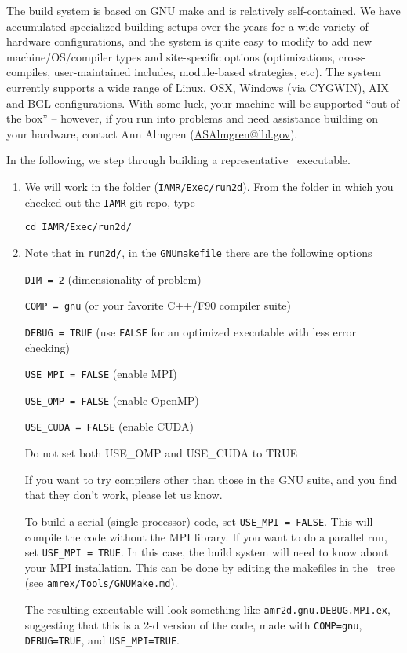 The build system is based on GNU make and is relatively self-contained.  We have accumulated 
specialized building setups over the years for a wide variety of hardware configurations, and 
the system is quite easy to modify to add new machine/OS/compiler types and site-specific 
options (optimizations, cross-compiles, user-maintained includes, module-based strategies, etc).
The system currently supports a wide range of Linux, OSX, Windows (via CYGWIN), AIX and BGL 
configurations. With some luck, your machine will be supported ``out of the box'' -- however, if 
you run into problems and need assistance building on your hardware, contact
Ann Almgren (\url{ASAlmgren@lbl.gov}).

In the following, we step through building a representative \iamr\ executable.
\begin{enumerate}
\item We will work in the folder ({\tt IAMR/Exec/run2d}).
From the folder in which you checked out the {\tt IAMR} git repo, type
\begin{verbatim}
cd IAMR/Exec/run2d/
\end{verbatim}

\item Note that in {\tt run2d/}, in the {\tt GNUmakefile} there are the following options

{\tt DIM = 2} (dimensionality of problem)

{\tt COMP = gnu} (or your favorite C++/F90 compiler suite)

{\tt DEBUG = TRUE} (use {\tt FALSE} for an optimized executable with less error checking)

{\tt USE\_MPI = FALSE} (enable MPI)

{\tt USE\_OMP = FALSE} (enable OpenMP)

{\tt USE\_CUDA = FALSE} (enable CUDA)

Do not set both USE\_OMP and USE\_CUDA to TRUE

If you want to try compilers other than those in the GNU suite, and you find that they don't
work, please let us know.

To build a serial (single-processor) code, set {\tt USE\_MPI = FALSE}.
This will compile the code without the MPI library.  If you want to do
a parallel run, set {\tt USE\_MPI = TRUE}.  In this
case, the build system will need to know about your MPI installation.
This can be done by editing the makefiles in the \amrex\ tree
(see {\tt amrex/Tools/GNUMake.md}).

The resulting executable will look something like {\tt amr2d.gnu.DEBUG.MPI.ex},
suggesting that this is a 2-d version of the code, made with 
{\tt COMP=gnu}, {\tt DEBUG=TRUE}, and {\tt USE\_MPI=TRUE}.

\end{enumerate}

